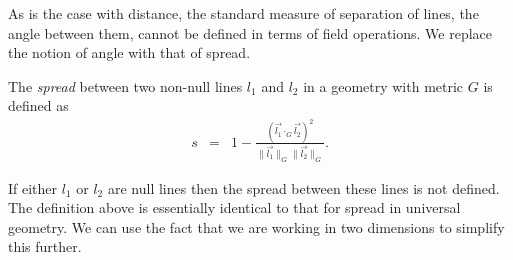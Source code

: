 As is the case with distance, the standard measure of separation of lines, the angle between them, cannot be defined in terms of field operations.
We replace the notion of angle with that of spread.

\begin{definition}The \emph{spread} between two non-null lines $l_1$ and $l_2$ in a geometry with metric $G$ is defined as
\begin{eqnarray}
s & = & 1 - \frac{\left(\vec{l_1}\cdot_G \vec{l_2}\right)^2}{\|\vec{l_1}\|_G\|\vec{l_2}\|_G}.
\end{eqnarray}
\end{definition}
If either $l_1$ or $l_2$ are null lines then the spread between these lines is not defined.
The definition above is essentially identical to that for spread in universal geometry.
We can use the fact that we are working in two dimensions to simplify this further.

